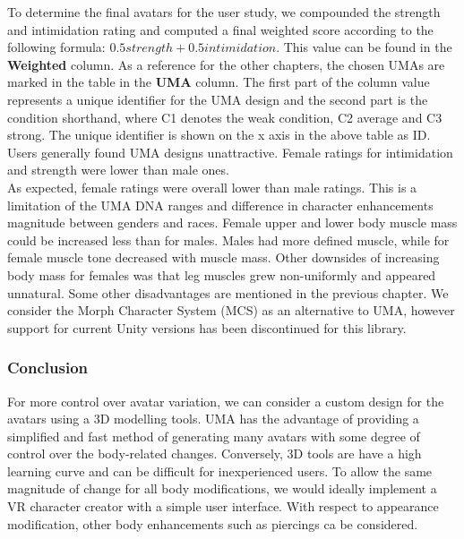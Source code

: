 To determine the final avatars for the user study, we compounded the strength and intimidation rating and computed a final weighted score according to the following formula: $ 0.5 strength + 0.5 intimidation $. This value can be found in the \textbf{Weighted} column. 
As a reference for the other chapters, the chosen UMAs are marked in the table in the \textbf{UMA} column. The first part of the column value represents a unique identifier for the UMA design and the second part is the condition shorthand, where C1 denotes the weak condition, C2 average and C3 strong. The unique identifier is shown on the x axis in the above table as ID.
Users generally found UMA designs unattractive. Female ratings for intimidation and strength were lower than male ones.
\\
As expected, female ratings were overall lower than male ratings. This is a limitation of the UMA DNA ranges and difference in character enhancements magnitude between  genders and races. Female upper and lower body muscle mass could be increased less than for males. Males had more defined muscle, while for female muscle tone decreased with muscle mass. Other downsides of increasing body mass for females was that leg muscles grew non-uniformly and appeared unnatural. Some other disadvantages are mentioned in the previous chapter. We consider the Morph Character System (MCS) as an alternative to UMA, however support for current Unity versions has been discontinued for this library.

\subsubsection{Conclusion}
For more control over avatar variation, we can consider a custom design for the avatars using a 3D modelling tools.  UMA has the advantage of providing a simplified and fast method of generating many avatars with some degree of control over the body-related changes. Conversely, 3D tools are have a high learning curve and can be difficult for inexperienced users. To allow the same magnitude of change for all body modifications, we would ideally implement a VR character creator with a simple user interface. With respect to appearance modification, other body enhancements such as piercings ca be considered.
